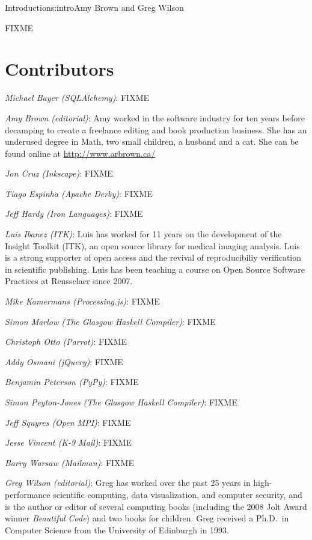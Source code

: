 \begin{aosachapter}{Introduction}{s:intro}{Amy Brown and Greg Wilson}

FIXME

\section*{Contributors}

\emph{Michael Bayer (SQLAlchemy)}: FIXME

\emph{Amy Brown (editorial)}: Amy worked in the software industry for
ten years before decamping to create a freelance editing and book production
business. She has an underused degree in Math, two small children, a
husband and a cat. She can be found online at \url{http://www.arbrown.ca/}

\emph{Jon Cruz (Inkscape)}: FIXME

\emph{Tiago Espinha (Apache Derby)}: FIXME

\emph{Jeff Hardy (Iron Languages)}: FIXME

\emph{Luis Ibanez (ITK)}: Luis has worked for 11 years on the development of
the Insight Toolkit (ITK), an open source library for medical imaging analysis.
Luis is a strong supporter of open access and the revival of reproducibiliy
verification in scientific publishing. Luis has been teaching a course on Open
Source Software Practices at Rensselaer since 2007.

\emph{Mike Kamermans (Processing.js)}: FIXME

\emph{Simon Marlow (The Glasgow Haskell Compiler)}: FIXME

\emph{Christoph Otto (Parrot)}: FIXME

\emph{Addy Osmani (jQuery)}: FIXME

\emph{Benjamin Peterson (PyPy)}: FIXME

\emph{Simon Peyton-Jones (The Glasgow Haskell Compiler)}: FIXME

\emph{Jeff Squyres (Open MPI)}: FIXME

\emph{Jesse Vincent (K-9 Mail)}: FIXME

\emph{Barry Warsaw (Mailman)}: FIXME

\emph{Greg Wilson (editorial)}: Greg has worked over the past 25 years
in high-performance scientific computing, data visualization, and
computer security, and is the author or editor of several computing
books (including the 2008 Jolt Award winner \emph{Beautiful Code}) and
two books for children.  Greg received a Ph.D.\ in Computer Science
from the University of Edinburgh in 1993.


\end{aosachapter}
